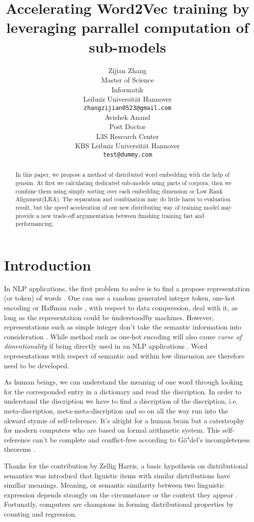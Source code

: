 \documentclass[11pt,a4paper]{article}
\title{Accelerating Word2Vec training by leveraging parrallel computation of sub-models}
\author{Zijian Zhang \\
  Master of Science\\
  Informatik\\
  Leibniz Universit{\"a}t Hannover\\
  {\tt zhangzijian0523@gmail.com}\\ \And
  Avishek Anand\\
  Post Doctor\\
  L3S Research Center\\
  KBS Leibniz Universit{\"a}t Hannover\\
  {\tt test@dummy.com}\\
  }
\date{}
\begin{document}
\maketitle

\begin{abstract}

    In this paper, we propose a method of distributed word embedding with the help of gensim. At first we calculating dedicated sub-models using parts of corpora, then we combine them using simply sorting over each embedding dimension or Low Rank Alignment(LRA). The separation and combination may do little harm to evaluation result, but the speed acceleration of our new distributing way of training model may provide a new trade-off argumentation between finishing training fast and performancing.
 
\end{abstract}


\section{Introduction}
In NLP applications, the first problem to solve is to find a propose representation (or token) of words \cite{schutze2008introduction}. One can use a random generated integer token, one-hot encoding \cite{turian2010word} or Haffman code \cite{elcompression}, with respect to data compression, deal with it, as long as the representation could be \'understood\' by machines. However, representations such as simple integer don't take the semantic information into consideration \cite{le2014distributed}. While method such as one-hot encoding will also cause \textit{curse of dimentionality} if being directly used in an NLP applications \cite{bengio2003neural}. Word representations with respect of semantic and within low dimension are therefore need to be developed. 

As human beings, we can understand the meaning of one word through looking for the corresponded entry in a dictionary and read the discription. In order to understand the discription we have to find a discription of the discription, i.e. meta-discription, meta-meta-discription and so on all the way run into the akward stymie of self-reference. It's alright for a human brain but a catestrophy for modern computers who are based on formal arithmetic system. This self-reference can't be complete and conflict-free according to G{\"o"}del's incompleteness theorems \cite{godel1931formal}.

Thanks for the contribution by Zellig Harris, a basic hypothesis on distributional semantics was introducd that liguistic items with similar distributions have simillar meanings. Meaning, or semantic similarity between two linguistic expression depends strongly on the circumstance or the context they appear \cite{harris1954distributional}. Fortunatly, computers are champions in forming distributional properties by counting and regression.
\end{document}
